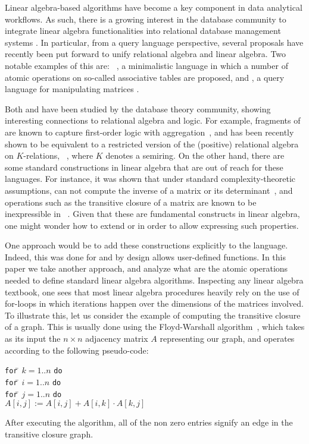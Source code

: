 Linear algebra-based algorithms have become a key component in data analytical workflows. As such, there is a growing interest in the database community to integrate linear algebra functionalities into relational database management systems \cite{Jermaine/17/LAonRA,2019Boehm,LARA_Berlin_2016,JankovLYCZJG19,Khamis0NOS18}. In particular, from a query language perspective, several proposals have recently been put forward to unify relational algebra and linear algebra. Two notable examples of this are: \lara~\cite{HutchisonHS17}, a minimalistic language in which a number of atomic operations on so-called associative tables are proposed, and \lang, a query language for manipulating matrices \cite{matlang,matlang-journal}.

Both \lara and \lang have been studied by the database theory community, showing interesting connections to relational algebra and logic. For example, fragments of \lara are known to capture first-order logic with aggregation~\cite{BarceloH0S20}, and \lang has been recently shown to be equivalent to a restricted version of the (positive) relational algebra on $K$-relations, \rak~\cite{brijder2019matrices}, where $K$ denotes a semiring. On the other hand, there are some standard constructions in linear algebra that are out of reach for these languages. For instance, it was shown that under standard complexity-theoretic assumptions, \lara can not compute the inverse of a matrix or its determinant~\cite{BarceloH0S20}, and operations such as the transitive closure of a matrix are known to be inexpressible in \lang~\cite{matlang,matlang-journal}. Given that these are fundamental constructs in linear algebra, one might wonder how to extend \lara or \lang in order to allow expressing such properties.

One approach would be to add these constructions explicitly to the language. Indeed, this was done for \lang and \lara by design allows user-defined functions. In this paper we take another approach, and analyze what are the atomic operations needed to define standard linear algebra algorithms. Inspecting any linear algebra textbook, one sees that most linear algebra procedures heavily rely on the use of for-loops in which iterations happen over the dimensions of the matrices involved. To illustrate this, let us consider the example of computing the transitive closure of a graph. This is usually done using  the Floyd-Warshall algorithm~\cite{cormen}, which takes as its input the $n\times n$ adjacency matrix $A$ representing our graph, and operates according to the following pseudo-code:
\vspace{-1ex}
\begin{tabbing}
\quad\texttt{for}\=\,  $k = 1..n$ \texttt{do}\\
\> \texttt{for}\=\,  $i = 1..n$ \texttt{do}\\
\> \> \texttt{for}\=\,  $j = 1..n$ \texttt{do}\\
\> \> \> $A[i,j] := A[i,j] + A[i,k]\cdot A[k,j]$
\end{tabbing}
\vspace{-1ex}
After executing the algorithm, all of the non zero entries signify an edge in the transitive closure graph. 

